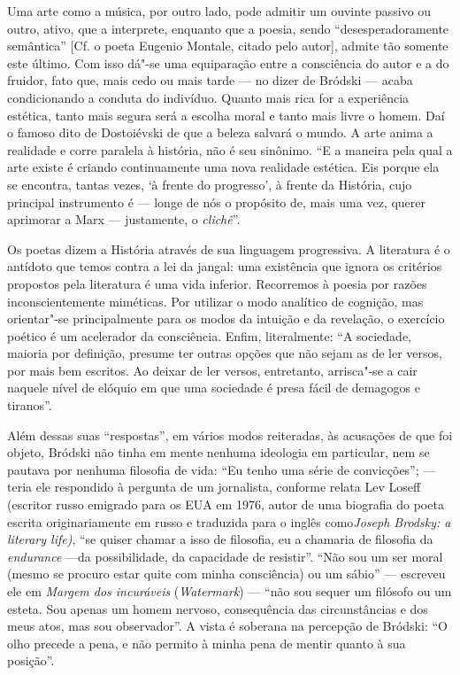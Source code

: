 Uma arte como a música, por outro lado, pode admitir um ouvinte passivo
ou outro, ativo, que a interprete, enquanto que a poesia, sendo
``desesperadoramente semântica'' {[}Cf. o poeta Eugenio Montale, citado
pelo autor{]}, admite tão somente este último. Com isso dá"-se uma
equiparação entre a consciência do autor e a do fruidor, fato que, mais
cedo ou mais tarde --- no dizer de Bródski --- acaba condicionando a
conduta do indivíduo. Quanto mais rica for a experiência estética, tanto
mais segura será a escolha moral e tanto mais livre o homem. Daí o
famoso dito de Dostoiévski de que a beleza salvará o mundo. A arte anima
a realidade e corre paralela à história, não é seu sinônimo. ``E a
maneira pela qual a arte existe é criando continuamente uma nova
realidade estética. Eis porque ela se encontra, tantas vezes, `à frente
do progresso', à frente da História, cujo principal instrumento é ---
longe de nós o propósito de, mais uma vez, querer aprimorar a Marx ---
justamente, o \emph{clichê}''.

Os poetas dizem a História através de sua linguagem progressiva. A
literatura é o antídoto que temos contra a lei da jangal: uma existência
que ignora os critérios propostos pela literatura é uma vida inferior.
Recorremos à poesia por razões inconscientemente miméticas. Por utilizar
o modo analítico de cognição, mas orientar"-se principalmente para os
modos da intuição e da revelação, o exercício poético é um acelerador da
consciência. Enfim, literalmente: ``A sociedade, maioria por definição,
presume ter outras opções que não sejam as de ler versos, por mais bem
escritos. Ao deixar de ler versos, entretanto, arrisca"-se a cair naquele
nível de elóquio em que uma sociedade é presa fácil de demagogos e
tiranos''.

Além dessas suas ``respostas'', em vários modos reiteradas, às
acusações de que foi objeto, Bródski não tinha em mente nenhuma
ideologia em particular, nem se pautava por nenhuma filosofia de vida:
``Eu tenho uma série de convicções''; --- teria ele respondido à
pergunta de um jornalista, conforme relata Lev Loseff (escritor russo emigrado
para os EUA em 1976, autor de uma biografia do poeta escrita
originariamente em russo e traduzida para o inglês como\emph{Joseph
Brodsky: a literary life)}, ``se quiser
chamar a isso de filosofia, eu a chamaria de filosofia da
\emph{endurance} ---da possibilidade, da capacidade de resistir''.
``Não sou um ser moral (mesmo se procuro estar quite com minha
consciência) ou um sábio'' --- escreveu ele em \emph{Margem dos
incuráveis} (\emph{Watermark}) --- ``não sou sequer um filósofo ou um
esteta. Sou apenas um homem nervoso, consequência das circunstâncias e
dos meus atos, mas sou observador''. A vista é soberana na percepção de
Bródski: ``O olho precede a pena, e não permito à minha pena de mentir
quanto à sua posição''.

